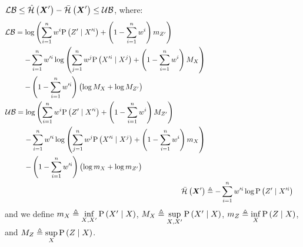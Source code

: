 \begin{proposition}
	\label{thm:boers_bounds_simple}
	$\operatorname*{\mathcal{LB}}\leq\hat{\mathcal{H}}\left({\boldsymbol X_{}^\prime}\right)-\bar{\mathcal{H}}_{}\left({\boldsymbol X_{}^\prime}\right)\leq\operatorname*{\mathcal{UB}}$, where:
	\begin{subequations}
		\begin{align}
			\begin{split}
				\lowerbound & =\log\left(\sum\limits_{i=1}^n\weight{}{i}\probcond{\observations{}^\prime}{\states{}^{\prime i}}+\left(1-\sum\limits_{i=1}^n\weight{}{i}\right)m_{\observations{}^\prime}\right) \\
				&\phantomeq-\sum_{i=1}^n\weight{}{\prime i}\log\left(\sum_{j=1}^n\weight{}{j}\probcond{\states{}^{\prime i}}{\states{}^j}+\left(1-\sum\limits_{i=1}^n\weight{}{i}\right)M_{\states{}}\right)\\
				& \phantomeq-\left(1-\sum_{i=1}^n\weight{}{\prime i}\right)\left(\log M_{\states{}}+\log M_{\observations{}^\prime}\right)
			\end{split}\\
			\begin{split}
				\upperbound & =\log\left(\sum\limits_{i=1}^n\weight{}{i}\probcond{\observations{}^\prime}{\states{}^{\prime i}}+\left(1-\sum\limits_{i=1}^n\weight{}{i}\right)M_{\observations{}^\prime}\right) \\
				&\phantomeq-\sum_{i=1}^n\weight{}{\prime i}\log\left(\sum_{j=1}^n\weight{}{j}\probcond{\states{}^{\prime i}}{\states{}^j}+\left(1-\sum\limits_{i=1}^n\weight{}{i}\right)m_{\states{}}\right)\\
				& \phantomeq-\left(1-\sum_{i=1}^n\weight{}{\prime i}\right)\left(\log m_{\states{}}+\log m_{\observations{}^\prime}\right)
			\end{split}\\
			\simplentropy{\statesRV{}^\prime}{} & \triangleq-\sum_{i=1}^n\weight{}{\prime i}\log\probcond{\observations{}^\prime}{\states{}^{\prime i}}
		\end{align}
	\end{subequations}
	and we define $m_{X_{}}\triangleq\inf\limits_{X_{},X_{}^\prime}\mathrm{P}\left({X_{}^\prime}\mid{\ensuremath{X_{}}}\right)$, $M_{X_{}}\triangleq\sup\limits_{X_{},X_{}^\prime}\mathrm{P}\left({X_{}^\prime}\mid{\ensuremath{X_{}}}\right)$, $m_{Z_{}}\triangleq\inf\limits_{X_{}}\mathrm{P}\left({Z_{}}\mid{\ensuremath{X_{}}}\right)$, and $M_{Z_{}}\triangleq\sup\limits_{X_{}}\mathrm{P}\left({Z_{}}\mid{\ensuremath{X_{}}}\right)$.
\end{proposition}
